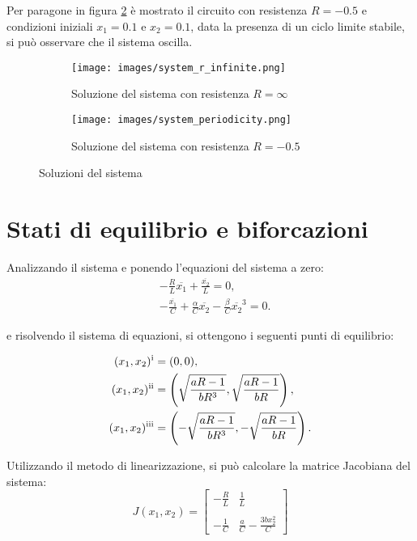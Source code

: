 \documentclass{article}
\newcommand{\rom}[1]{\uppercase\expandafter{\romannumeral #1\relax}}
\begin{document}
Per paragone in figura \ref{fig:oscillazione_circuito} è mostrato il circuito con resistenza \(R = -0.5\) e condizioni iniziali \(x_1 = 0.1\) e \(x_2 = 0.1\), data la presenza di un ciclo limite stabile, si può osservare che il sistema oscilla.

\begin{figure}[ht]
    \centering
    \begin{subfigure}{0.49\textwidth}
        \texttt{[image: images/system\_r\_infinite.png]}
        \caption{Soluzione del sistema con resistenza \(R = \infty\)}
        \label{fig:soluzione_ode}
    \end{subfigure}
    \hfill
    \begin{subfigure}{0.49\textwidth}
        \texttt{[image: images/system\_periodicity.png]}
        \caption{Soluzione del sistema con resistenza \(R = -0.5\)}
        \label{fig:oscillazione_circuito}
    \end{subfigure}
    \caption{Soluzioni del sistema}
    \label{fig:soluzioni}
\end{figure}

\section{Stati di equilibrio e biforcazioni}

Analizzando il sistema e ponendo l'equazioni del sistema a zero:
\begin{align*}
     & -\frac{R}{L}\overline{x_1} + \frac{\overline{x_2}}{L} = 0,                                        \\
     & -\frac{\overline{x_1}}{C} + \frac{\alpha}{C}\overline{x_2} - \frac{\beta}{C}\overline{x_2}^3 = 0.
\end{align*}

e risolvendo il sistema di equazioni, si ottengono i seguenti punti di equilibrio:

\begin{align*}
    (x_1, x_2)^\text{\rom{1}} & = (0, 0),                                                                \\
    (x_1, x_2)^\text{\rom{2}} & = \left(\sqrt{\frac{a R - 1}{b R^3}}, \sqrt{\frac{aR - 1}{bR}}\right),   \\
    (x_1, x_2)^\text{\rom{3}} & = \left(-\sqrt{\frac{a R - 1}{b R^3}}, -\sqrt{\frac{aR - 1}{bR}}\right).
\end{align*}

Utilizzando il metodo di linearizzazione, si può calcolare la matrice Jacobiana del sistema:
\[
    J(x_1, x_2) =
    \begin{bmatrix}
        -\frac{R}{L} & \frac{1}{L}                      \\\\
        -\frac{1}{C} & \frac{a}{C} - \frac{3b x_2^2}{C}
    \end{bmatrix}
\]
\end{document}
